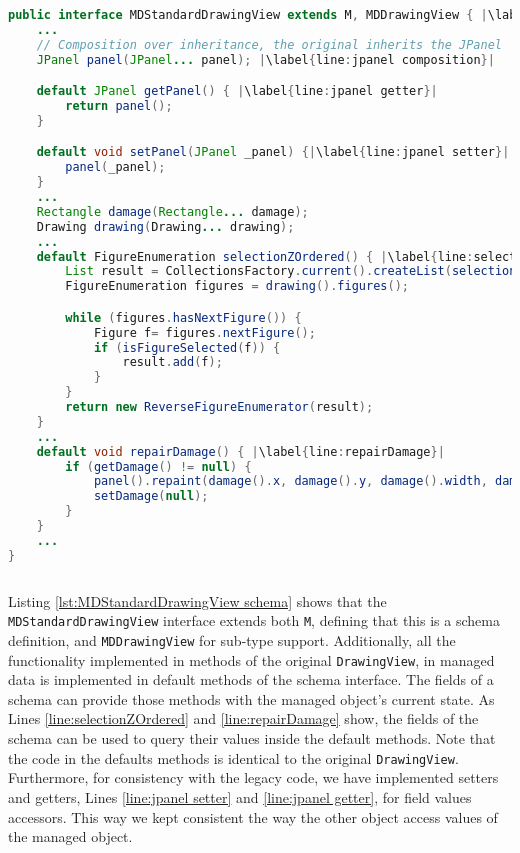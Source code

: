 \begin{sourcecode}[H]
	\begin{lstlisting}[language=Java, escapechar=|]
public interface MDStandardDrawingView extends M, MDDrawingView { |\label{line:MDStandardDrawingView extends M, MDDrawingView}|
	...
	// Composition over inheritance, the original inherits the JPanel
	JPanel panel(JPanel... panel); |\label{line:jpanel composition}|

	default JPanel getPanel() { |\label{line:jpanel getter}|
	    return panel();
	}

	default void setPanel(JPanel _panel) {|\label{line:jpanel setter}|
	    panel(_panel);
	}
	...
	Rectangle damage(Rectangle... damage);
	Drawing drawing(Drawing... drawing);
	...
	default FigureEnumeration selectionZOrdered() { |\label{line:selectionZOrdered}|
		List result = CollectionsFactory.current().createList(selectionCount());
		FigureEnumeration figures = drawing().figures();

		while (figures.hasNextFigure()) {
			Figure f= figures.nextFigure();
			if (isFigureSelected(f)) {
				result.add(f);
			}
		}
		return new ReverseFigureEnumerator(result);
	}
	...
	default void repairDamage() { |\label{line:repairDamage}|
		if (getDamage() != null) {
			panel().repaint(damage().x, damage().y, damage().width, damage().height);
			setDamage(null);
		}
	}
	...
}
	\end{lstlisting}
	\caption{MDStandardDrawingView schema}
	\label{lst:MDStandardDrawingView schema}
\end{sourcecode}

Listing \ref{lst:MDStandardDrawingView schema} shows that the \texttt{MDStandardDrawingView} interface extends both \texttt{M}, defining that this is a schema definition, and \texttt{MDDrawingView} for sub-type support.
Additionally, all the functionality implemented in methods of the original \texttt{DrawingView}, in managed data is implemented in default methods of the schema interface.
The fields of a schema can provide those methods with the managed object's current state.
As Lines \ref{line:selectionZOrdered} and \ref{line:repairDamage} show, the fields of the schema can be used to query their values inside the default methods.
Note that the code in the defaults methods is identical to the original \texttt{DrawingView}.
Furthermore, for consistency with the legacy code, we have implemented setters and getters, Lines \ref{line:jpanel setter} and \ref{line:jpanel getter}, for field values accessors.
This way we kept consistent the way the other object access values of the managed object.

